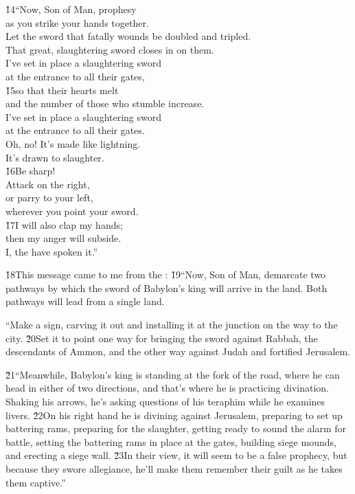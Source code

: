 \begin{poetry}
\poeml \v{14}``Now, Son of Man, prophesy \\
\poemll    as you strike your hands together. \\
\poeml Let the sword that fatally wounds be doubled and tripled. \\
\poemll    That great, slaughtering sword closes in on them. \\
\poeml I've set in place a slaughtering sword \\
\poemll    at the entrance to all their gates, \\
\poeml \v{15}so that their hearts melt \\
\poemll    and the number of those who stumble increase. \\
\poeml I've set in place a slaughtering sword \\
\poemll    at the entrance to all their gates. \\
\poeml Oh, no! It's made like lightning. \\
\poemll    It's drawn to slaughter. \\
\poeml \v{16}Be sharp! \\
\poemll    Attack on the right, \\
\poeml or parry to your left, \\
\poemll    wherever you point your sword. \\
\poeml \v{17}I will also clap my hands; \\
\poemll    then my anger will subside. \\
\poemlll       I, the  have spoken it.''
\end{poetry}

\v{18}This message came to me from the : \v{19}``Now, Son of Man, demarcate two pathways by which the sword of Babylon's king will arrive in the land. Both pathways will lead from a single land.

``Make a sign, carving it out and installing it at the junction on the way to the city. \v{20}Set it to point one way for bringing the sword against Rabbah, the descendants of Ammon, and the other way against Judah and fortified Jerusalem.

\v{21}``Meanwhile, Babylon's king is standing at the fork of the road, where he can head in either of two directions, and that's where he is practicing divination. Shaking his arrows, he's asking questions of his teraphim while he examines livers. \v{22}On his right hand he is divining against Jerusalem, preparing to set up battering rams, preparing for the slaughter, getting ready to sound the alarm for battle, setting the battering rams in place at the gates, building siege mounds, and erecting a siege wall. \v{23}In their view, it will seem to be a false prophecy, but because they swore allegiance, he'll make them remember their guilt as he takes them captive.''

